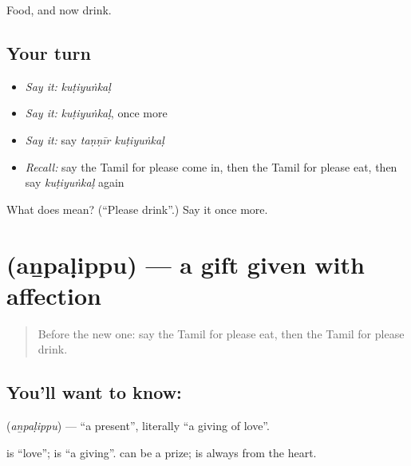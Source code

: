 \begin{grammarlens}[title={What you've built}]
Food, and now drink.
\end{grammarlens}

\subsection*{Your turn}
\begin{itemize}
\raggedright
  \item \emph{Say it:} \emph{kuṭiyuṅkaḷ}
  \item \emph{Say it:} \emph{kuṭiyuṅkaḷ}, once more
  \item \emph{Say it:} say \emph{taṇṇīr kuṭiyuṅkaḷ}
  \item \emph{Recall:} say the Tamil for please come in, then the Tamil for please eat, then say \emph{kuṭiyuṅkaḷ} again
\end{itemize}

\begin{tcolorbox}[breakable,colback=teal!4,colframe=teal!35!black,title={Before you move on}]
What does  mean? (\textquotedblleft{}Please drink\textquotedblright{}.) Say it once more.
\end{tcolorbox}
\section[\texorpdfstring{\ta{அன்பளிப்பு} (aṉpaḷippu)}{அன்பளிப்பு (aṉpaḷippu)}]{ (aṉpaḷippu) — a gift given with affection}

\label{lesson:TA-C99-present}



\begin{quote}
Before the new one: say the Tamil for please eat, then the Tamil for please drink.
\end{quote}

\subsection*{You'll want to know: }
\textbf{} (\emph{aṉpaḷippu}) — \textquotedblleft{}a present\textquotedblright{}, literally \textquotedblleft{}a giving of love\textquotedblright{}.

\textbf{} is \textquotedblleft{}love\textquotedblright{}; \textbf{} is \textquotedblleft{}a giving\textquotedblright{}. \textbf{} can be a prize; \textbf{} is always from the heart.

